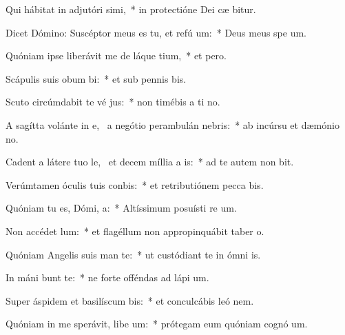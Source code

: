 \item Qui hábitat in adjutóri simi,~* in protectióne Dei cæ bitur.
\item Dicet Dómino: Suscéptor meus es tu, et refú um:~* Deus meus spe  um.
\item Quóniam ipse liberávit me de láque tium,~* et   pero.
\item Scápulis suis obum bi:~* et sub pennis  bis.
\item Scuto circúmdabit te vé jus:~* non timébis a ti no.
\item A sagítta volánte in e,~\pscross{} a negótio perambulán  nebris:~* ab incúrsu et dæmónio no.
\item Cadent a látere tuo le,~\pscross{} et decem míllia a  is:~* ad te autem non bit.
\item Verúmtamen óculis tuis conbis:~* et retributiónem pecca bis.
\item Quóniam tu es, Dómi,  a:~* Altíssimum posuísti re um.
\item Non accédet   lum:~* et flagéllum non appropinquábit taber o.
\item Quóniam Angelis suis man  te:~* ut custódiant te in ómni  is.
\item In máni bunt te:~* ne forte offéndas ad lápi  um.
\item Super áspidem et basilíscum bis:~* et conculcábis leó  nem.
\item Quóniam in me sperávit, libe um:~* prótegam eum quóniam cognó  um.

